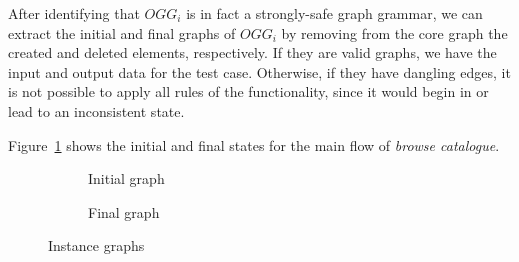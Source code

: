 After identifying that $OGG_i$ is in fact a strongly-safe graph grammar, we can extract the initial and final graphs of $OGG_i$ by removing from the core graph the created and deleted elements, respectively. If they are valid graphs, we have the input and output data for the test case. Otherwise, if they have dangling edges, it is not possible to apply all rules of the functionality, since it would begin in or lead to an inconsistent state.

\begin{example} Figure~\ref{fig:tests:graphs} shows the initial and final states for the main flow of \emph{browse catalogue}.

\begin{figure}[!ht]
  \centering
  \begin{subfigure}[t]{.5\textwidth}
    \centerline{}
    \caption{Initial graph}
  \end{subfigure}%
  \begin{subfigure}[t]{.5\textwidth}
    \centerline{}
    \caption{Final graph}
  \end{subfigure}
  \caption{Instance graphs}\label{fig:tests:graphs}
\end{figure}
\end{example}

